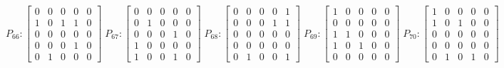     $$
        P_{66} : \begin{bmatrix}
            0 & 0 & 0 & 0 & 0 \\
            1 & 0 & 1 & 1 & 0 \\
            0 & 0 & 0 & 0 & 0 \\
            0 & 0 & 0 & 1 & 0 \\
            0 & 1 & 0 & 0 & 0
        \end{bmatrix}
        \;
         P_{67} : \begin{bmatrix}
            0 & 0 & 0 & 0 & 0 \\
            0 & 1 & 0 & 0 & 0 \\
            0 & 0 & 0 & 1 & 0 \\
            1 & 0 & 0 & 0 & 0 \\
            1 & 0 & 0 & 1 & 0
        \end{bmatrix}
        \; 
        P_{68} : \begin{bmatrix}
            0 & 0 & 0 & 0 & 1 \\
            0 & 0 & 0 & 1 & 1 \\
            0 & 0 & 0 & 0 & 0 \\
            0 & 0 & 0 & 0 & 0 \\
            0 & 1 & 0 & 0 & 1
        \end{bmatrix}
        \;  
        P_{69} : \begin{bmatrix}
            1 & 0 & 0 & 0 & 0 \\
            0 & 0 & 0 & 0 & 0 \\
            1 & 1 & 0 & 0 & 0 \\
            1 & 0 & 1 & 0 & 0 \\
            0 & 0 & 0 & 0 & 0
        \end{bmatrix}
        \;
        P_{70} : \begin{bmatrix}
            1 & 0 & 0 & 0 & 0 \\
            1 & 0 & 1 & 0 & 0 \\
            0 & 0 & 0 & 0 & 0 \\
            0 & 0 & 0 & 0 & 0 \\
            0 & 1 & 0 & 1 & 0
        \end{bmatrix}
    $$

